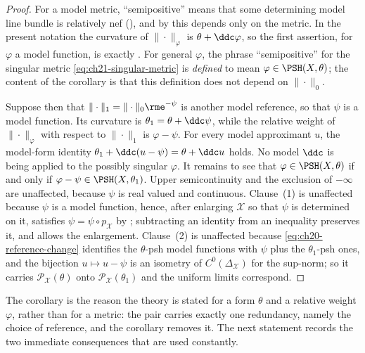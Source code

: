 \begin{proof}
For a model metric, ``semipositive'' means that some determining model line
bundle is relatively nef (), and by
 this depends only on the metric.  In the
present notation the curvature of $\|\cdot\|_\varphi$ is
$\theta+\ddc\varphi$, so the first assertion, for $\varphi$ a model
function, is exactly .  For general
$\varphi$, the phrase ``semipositive'' for the singular metric
\eqref{eq:ch21-singular-metric} is \emph{defined} to mean
$\varphi\in\PSH(X,\theta)$; the content of the corollary is that this
definition does not depend on $\|\cdot\|_0$.

Suppose then that $\|\cdot\|_1=\|\cdot\|_0\rme^{-\psi}$ is another model
reference, so that $\psi$ is a model function.  Its curvature is
$\theta_1=\theta+\ddc\psi$, while the relative weight of
$\|\cdot\|_\varphi$ with respect to $\|\cdot\|_1$ is
$\varphi-\psi$.  For every model approximant $u$, the model-form identity
$\theta_1+\ddc(u-\psi)=\theta+\ddc u$ holds.  No model $\ddc$ is
being applied to the possibly singular $\varphi$.  It remains to see that
$\varphi\in\PSH(X,\theta)$ if and only if
$\varphi-\psi\in\PSH(X,\theta_1)$.  Upper semicontinuity and the exclusion
of $-\infty$ are unaffected, because $\psi$ is real valued and
continuous.  Clause~(1) is unaffected because $\psi$ is a model function,
hence, after enlarging $\mathcal X$ so that $\psi$ is determined on it,
satisfies $\psi=\psi\circ p_{\mathcal X}$ by
; subtracting an identity from an inequality
preserves it, and  allows the
enlargement.  Clause~(2) is unaffected because
\eqref{eq:ch20-reference-change} identifies the $\theta$-psh model
functions with $\psi$ plus the $\theta_1$-psh ones, and the bijection
$u\mapsto u-\psi$ is an isometry of $C^0(\Delta_{\mathcal X})$ for the
sup-norm; so it carries $\mathcal P_{\mathcal X}(\theta)$ onto
$\mathcal P_{\mathcal X}(\theta_1)$ and the uniform limits correspond.
\end{proof}

The corollary is the reason the theory is stated for a form $\theta$ and a
relative weight $\varphi$, rather than for a metric: the pair carries
exactly one redundancy, namely the choice of reference, and the corollary
removes it.  The next statement records the two immediate consequences that
are used constantly.

